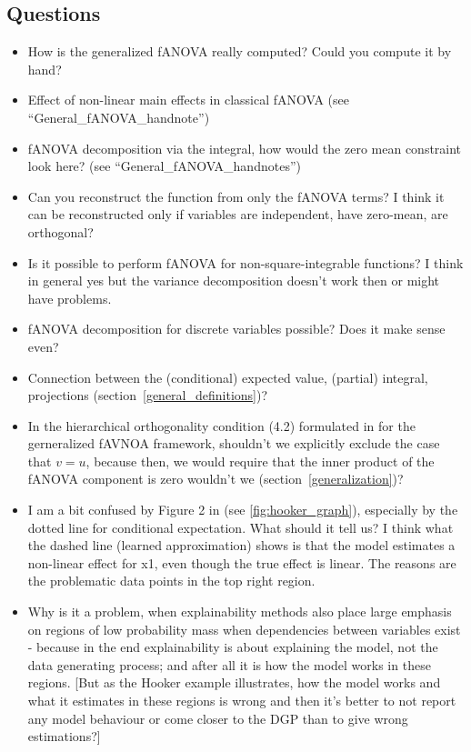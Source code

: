 \subsection*{Questions}
\begin{itemize}
    \item How is the generalized fANOVA really computed? Could you compute it by hand?
    \item Effect of non-linear main effects in classical fANOVA (see ``General\_fANOVA\_handnote'')
    \item fANOVA decomposition via the integral, how would the zero mean constraint look here? (see ``General\_fANOVA\_handnotes'')
    \item Can you reconstruct the function from only the fANOVA terms? I think it can be reconstructed only if variables are independent, have zero-mean, are orthogonal?
    \item Is it possible to perform fANOVA for non-square-integrable functions? I think in general yes but the variance decomposition doesn't work then or might have problems.
    \item fANOVA decomposition for discrete variables possible? Does it make sense even?
    \item Connection between the (conditional) expected value, (partial) integral, projections (section~\ref{general_definitions})?
    \item In the hierarchical orthogonality condition (4.2) formulated in \cite{hooker2007} for the gerneralized fAVNOA framework, shouldn't we explicitly exclude the case that $v = u$, because then, we would require that the inner product of the fANOVA component is zero wouldn't we (section~\ref{generalization})?
    \item I am a bit confused by Figure 2 in \cite{hooker2007} (see \autoref{fig:hooker_graph}), especially by the dotted line for conditional expectation. What should it tell us? I think what the dashed line (learned approximation) shows is that the model estimates a non-linear effect for x1, even though the true effect is linear. The reasons are the problematic data points in the top right region.
    \item Why is it a problem, when explainability methods also place large emphasis on regions of low probability mass when dependencies between variables exist - because in the end explainability is about explaining the model, not the data generating process; and after all it is how the model works in these regions. [But as the Hooker example illustrates, how the model works and what it estimates in these regions is wrong and then it's better to not report any model behaviour or come closer to the DGP than to give wrong estimations?]

\end{itemize}
